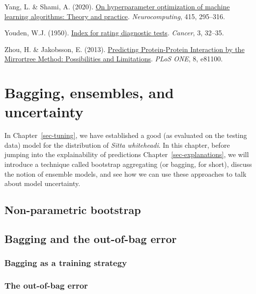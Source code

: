 \documentclass[
  letterpaper,
]{scrbook}
\newlength{\cslhangindent}
\newenvironment{CSLReferences}[2] %
 {\begin{list}{}{%
  \setlength{\itemindent}{0pt}
  \setlength{\leftmargin}{0pt}
  \setlength{\parsep}{0pt}
  \ifodd #1
   \setlength{\leftmargin}{\cslhangindent}
   \setlength{\itemindent}{-1\cslhangindent}
  \fi
  \setlength{\itemsep}{#2\baselineskip}}}
 {\end{list}}
\begin{document}
\begin{CSLReferences}{1}{0}
Yang, L. \& Shami, A. (2020).
\href{https://doi.org/10.1016/j.neucom.2020.07.061}{On hyperparameter
optimization of machine learning algorithms: Theory and practice}.
\emph{Neurocomputing}, 415, 295--316.

Youden, W.J. (1950).
\href{https://doi.org/10.1002/1097-0142(1950)3:1\%3C32::aid-cncr2820030106\%3E3.0.co;2-3}{Index
for rating diagnostic tests}. \emph{Cancer}, 3, 32--35.

Zhou, H. \& Jakobsson, E. (2013).
\href{https://doi.org/10.1371/journal.pone.0081100}{Predicting
Protein-Protein Interaction by the Mirrortree Method: Possibilities and
Limitations}. \emph{PLoS ONE}, 8, e81100.

\end{CSLReferences}


\chapter{Bagging, ensembles, and uncertainty}\label{sec-bagging}

In Chapter~\ref{sec-tuning}, we have established a good (as evaluated on
the testing data) model for the distribution of \emph{Sitta whiteheadi}.
In this chapter, before jumping into the explainability of predictions
Chapter~\ref{sec-explanations}, we will introduce a technique called
bootstrap aggregating (or bagging, for short), discuss the notion of
ensemble models, and see how we can use these approaches to talk about
model uncertainty.

\section{Non-parametric bootstrap}\label{non-parametric-bootstrap}

\section{Bagging and the out-of-bag
error}\label{bagging-and-the-out-of-bag-error}

\subsection{Bagging as a training
strategy}\label{bagging-as-a-training-strategy}

\subsection{The out-of-bag error}\label{the-out-of-bag-error}
\end{document}

